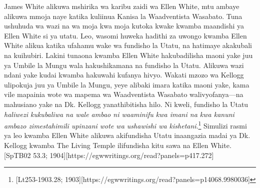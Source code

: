 James White alikuwa mshirika wa karibu zaidi wa Ellen White, mtu ambaye alikuwa mmoja naye katika kuliinua Kanisa la Waadventista Wasabato. Tuna ushuhuda wa wazi na wa moja kwa moja kutoka kwake kwamba maandishi ya Ellen White si ya utatu. Leo, wasomi huweka hadithi za uwongo kwamba Ellen White alikua katika ufahamu wake wa fundisho la Utatu, na hatimaye akakubali na kuihubiri. Lakini tunaona kwamba Ellen White hakubadilisha maoni yake juu ya Umbile la Mungu wala hakushikamana na fundisho la Utatu. Alikuwa wazi ndani yake kudai kwamba hakuwahi kufanya hivyo. Wakati mzozo wa Kellogg ulipokuja juu ya Umbile la Mungu, yeye alibaki imara katika maoni yake, kama vile mapainia wote wa mapema wa Waadventista Wasabato walivyofanya—na mahusiano yake na Dk. Kellogg yanathibitisha hilo. Ni kweli, fundisho la Utatu \textit{haliwezi kukubaliwa na wale ambao ni waaminifu kwa imani na kwa kanuni ambazo zimestahimili upinzani wote wa ushawishi wa kishetani}.\footnote{[Lt253-1903.28; 1903][https://egwwritings.org/read?panels=p14068.9980036]} Simulizi rasmi ya leo kwamba Ellen White alikuwa akifundisha Utatu inaangazia madai ya Dk. Kellogg kwamba The Living Temple ilifundisha kitu sawa na Ellen White. [SpTB02 53.3; 1904][https://egwwritings.org/read?panels=p417.272]






